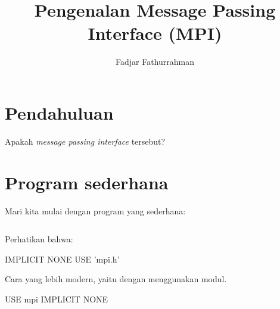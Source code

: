 \documentclass[bahasa,a4paper,12pt]{extarticle}
\begin{document}
\title{Pengenalan Message Passing Interface (MPI)}
\author{Fadjar Fathurrahman}
\maketitle

\section{Pendahuluan}

Apakah \textit{message passing interface} tersebut?


\section{Program sederhana}

Mari kita mulai dengan program yang sederhana:
\inputminted[breaklines,fontsize=\footnotesize]{fortran}{progs/01_simple.f90}

Perhatikan bahwa:
\begin{fortrancode}
IMPLICIT NONE
USE 'mpi.h'
\end{fortrancode}

Cara yang lebih modern, yaitu dengan menggunakan modul.
\begin{fortrancode}
USE mpi
IMPLICIT NONE
\end{fortrancode}
\end{document}
